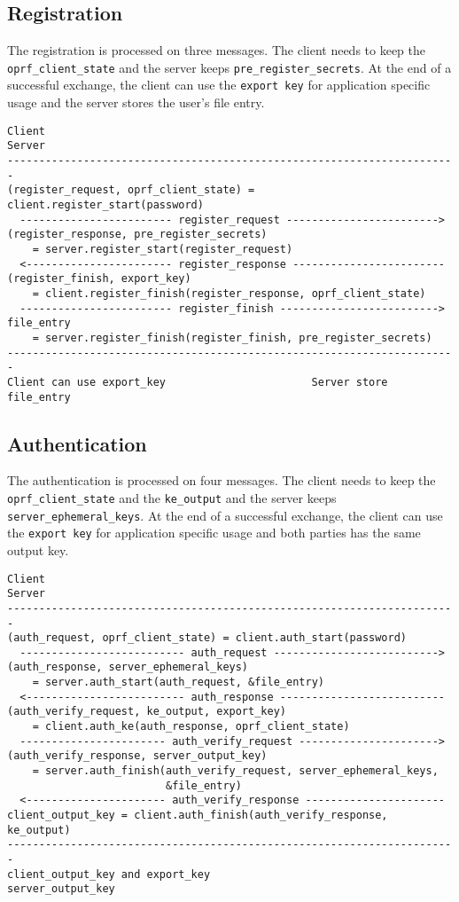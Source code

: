 ﻿\documentclass[../report.tex]{subfiles}
\begin{document}
\subsection{Registration}
The registration is processed on three messages. The client needs to keep the \verb|oprf_client_state| and the server keeps \verb|pre_register_secrets|. At the end of a successful exchange, the client can use the \verb|export key| for application specific usage and the server stores the  user's file entry.
\begin{verbatim}
Client                                                           Server
-----------------------------------------------------------------------
(register_request, oprf_client_state) = client.register_start(password)
  ------------------------ register_request ------------------------>
(register_response, pre_register_secrets)
    = server.register_start(register_request)
  <----------------------- register_response ------------------------
(register_finish, export_key)
    = client.register_finish(register_response, oprf_client_state)
  ------------------------ register_finish ------------------------->
file_entry 
    = server.register_finish(register_finish, pre_register_secrets)
-----------------------------------------------------------------------
Client can use export_key                       Server store file_entry
\end{verbatim}
\subsection{Authentication}
The authentication is processed on four messages.
The client needs to keep the \verb|oprf_client_state| and the \verb|ke_output| and the server keeps \verb|server_ephemeral_keys|. At the end of a successful exchange, the client can use the \verb|export key| for application specific usage and both parties has the same output key.

\begin{verbatim}
Client                                                           Server
-----------------------------------------------------------------------
(auth_request, oprf_client_state) = client.auth_start(password)
  -------------------------- auth_request -------------------------->
(auth_response, server_ephemeral_keys) 
    = server.auth_start(auth_request, &file_entry)
  <------------------------- auth_response --------------------------
(auth_verify_request, ke_output, export_key) 
    = client.auth_ke(auth_response, oprf_client_state)
  ----------------------- auth_verify_request ---------------------->
(auth_verify_response, server_output_key) 
    = server.auth_finish(auth_verify_request, server_ephemeral_keys,
                         &file_entry)
  <---------------------- auth_verify_response ----------------------
client_output_key = client.auth_finish(auth_verify_response, ke_output)
-----------------------------------------------------------------------
client_output_key and export_key                      server_output_key
\end{verbatim}
\end{document}
